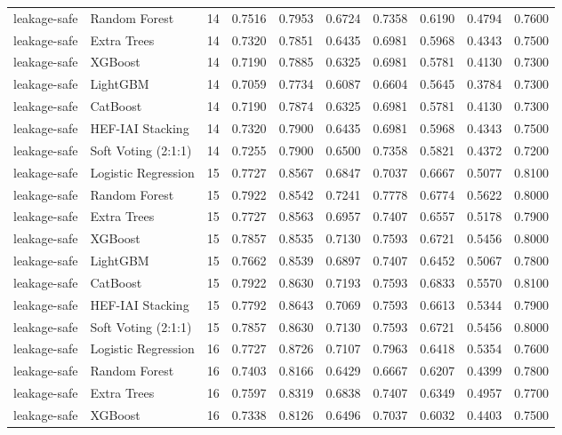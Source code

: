 \begin{tabular}{llrrrrrrrr}
leakage-safe & Random Forest & 14 & 0.7516 & 0.7953 & 0.6724 & 0.7358 & 0.6190 & 0.4794 & 0.7600 \\
leakage-safe & Extra Trees & 14 & 0.7320 & 0.7851 & 0.6435 & 0.6981 & 0.5968 & 0.4343 & 0.7500 \\
leakage-safe & XGBoost & 14 & 0.7190 & 0.7885 & 0.6325 & 0.6981 & 0.5781 & 0.4130 & 0.7300 \\
leakage-safe & LightGBM & 14 & 0.7059 & 0.7734 & 0.6087 & 0.6604 & 0.5645 & 0.3784 & 0.7300 \\
leakage-safe & CatBoost & 14 & 0.7190 & 0.7874 & 0.6325 & 0.6981 & 0.5781 & 0.4130 & 0.7300 \\
leakage-safe & HEF-IAI Stacking & 14 & 0.7320 & 0.7900 & 0.6435 & 0.6981 & 0.5968 & 0.4343 & 0.7500 \\
leakage-safe & Soft Voting (2:1:1) & 14 & 0.7255 & 0.7900 & 0.6500 & 0.7358 & 0.5821 & 0.4372 & 0.7200 \\
leakage-safe & Logistic Regression & 15 & 0.7727 & 0.8567 & 0.6847 & 0.7037 & 0.6667 & 0.5077 & 0.8100 \\
leakage-safe & Random Forest & 15 & 0.7922 & 0.8542 & 0.7241 & 0.7778 & 0.6774 & 0.5622 & 0.8000 \\
leakage-safe & Extra Trees & 15 & 0.7727 & 0.8563 & 0.6957 & 0.7407 & 0.6557 & 0.5178 & 0.7900 \\
leakage-safe & XGBoost & 15 & 0.7857 & 0.8535 & 0.7130 & 0.7593 & 0.6721 & 0.5456 & 0.8000 \\
leakage-safe & LightGBM & 15 & 0.7662 & 0.8539 & 0.6897 & 0.7407 & 0.6452 & 0.5067 & 0.7800 \\
leakage-safe & CatBoost & 15 & 0.7922 & 0.8630 & 0.7193 & 0.7593 & 0.6833 & 0.5570 & 0.8100 \\
leakage-safe & HEF-IAI Stacking & 15 & 0.7792 & 0.8643 & 0.7069 & 0.7593 & 0.6613 & 0.5344 & 0.7900 \\
leakage-safe & Soft Voting (2:1:1) & 15 & 0.7857 & 0.8630 & 0.7130 & 0.7593 & 0.6721 & 0.5456 & 0.8000 \\
leakage-safe & Logistic Regression & 16 & 0.7727 & 0.8726 & 0.7107 & 0.7963 & 0.6418 & 0.5354 & 0.7600 \\
leakage-safe & Random Forest & 16 & 0.7403 & 0.8166 & 0.6429 & 0.6667 & 0.6207 & 0.4399 & 0.7800 \\
leakage-safe & Extra Trees & 16 & 0.7597 & 0.8319 & 0.6838 & 0.7407 & 0.6349 & 0.4957 & 0.7700 \\
leakage-safe & XGBoost & 16 & 0.7338 & 0.8126 & 0.6496 & 0.7037 & 0.6032 & 0.4403 & 0.7500 \\

\end{tabular}
